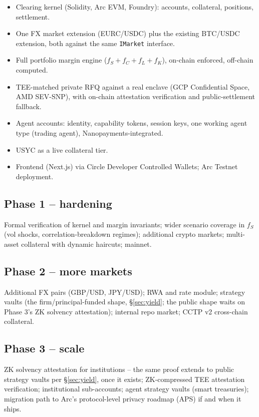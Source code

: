 \documentclass[11pt,a4paper]{article}
\begin{document}
\begin{itemize}
  \item Clearing kernel (Solidity, Arc EVM, Foundry): accounts, collateral, positions, settlement.
  \item One FX market extension (EURC/USDC) plus the existing BTC/USDC extension, both against the same \texttt{IMarket} interface.
  \item Full portfolio margin engine ($f_S+f_C+f_L+f_K$), on-chain enforced, off-chain computed.
  \item TEE-matched private RFQ against a real enclave (GCP Confidential Space, AMD SEV-SNP), with on-chain attestation verification and public-settlement fallback.
  \item Agent accounts: identity, capability tokens, session keys, one working agent type (trading agent), Nanopayments-integrated.
  \item USYC as a live collateral tier.
  \item Frontend (Next.js) via Circle Developer Controlled Wallets; Arc Testnet deployment.
\end{itemize}

\subsection{Phase 1 -- hardening}
Formal verification of kernel and margin invariants; wider scenario coverage in $f_S$ (vol shocks, correlation-breakdown regimes); additional crypto markets; multi-asset collateral with dynamic haircuts; mainnet.

\subsection{Phase 2 -- more markets}
Additional FX pairs (GBP/USD, JPY/USD); RWA and rate module; strategy vaults (the firm/principal-funded shape, \S\ref{sec:yield}; the public shape waits on Phase 3's ZK solvency attestation); internal repo market; CCTP v2 cross-chain collateral.

\subsection{Phase 3 -- scale}
ZK solvency attestation for institutions -- the same proof extends to public strategy vaults per \S\ref{sec:yield}, once it exists; ZK-compressed TEE attestation verification; institutional sub-accounts; agent strategy vaults (smart treasuries); migration path to Arc's protocol-level privacy roadmap (APS) if and when it ships.
\end{document}
